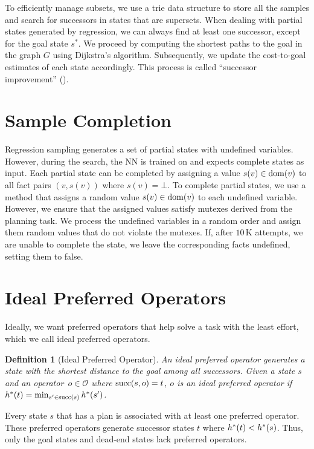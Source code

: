 \documentclass[ppgc,diss,english]{iiufrgs}
\newtheorem{definition}{Definition}
\newtheorem{property}{Property}
\newcommand{\ppi}[2][inline]{\todo[color=purple!50,linecolor={purple!100},#1,fancyline,author=Pedro]{#2}}
\begin{document}
To efficiently manage subsets, we use a trie data structure to store all the samples and search for successors in states that are supersets. When dealing with partial states generated by regression, we can always find at least one successor, except for the goal state $s^{*}$. We proceed by computing the shortest paths to the goal in the graph $G$ using Dijkstra's algorithm. Subsequently, we update the cost-to-goal estimates of each state accordingly. This process is called ``successor improvement'' (\sui).


\section{Sample Completion}
\label{sec:sample-completion}

Regression sampling generates a set of partial states with undefined variables. However, during the search, the NN is trained on and expects complete states as input.
Each partial state can be completed by assigning a value $s(v)\in\operatorname{dom}(v)$ to all fact pairs $(v,s(v))$ where $s(v)=\bot$.
To complete partial states, we use a method that assigns a random value $s(v) \in \operatorname{dom}(v)$ to each undefined variable. However, we ensure that the assigned values satisfy mutexes derived from the planning task. We process the undefined variables in a random order and assign them random values that do not violate the mutexes. If, after $10$\,K attempts, we are unable to complete the state, we leave the corresponding facts undefined, setting them to false.%


\section{Ideal Preferred Operators}
\label{sec:sample-ideal-po}
Ideally, we want preferred operators that help solve a task with the least effort, which we call ideal preferred operators.

\begin{definition}[Ideal Preferred Operator]\label{def:ideal_preferred_operator}
  An ideal preferred operator generates a state with the shortest distance to the goal among all successors. Given a state $s$ and an operator~$o \in \mathcal{O}$ where $\operatorname{succ}(s,o) = t$, $o$ is an ideal preferred operator if $h^*({t}) = \min_{s' \in \operatorname{succ}(s)} h^*({s'})$.
\end{definition}

Every state $s$ that has a plan is associated with at least one preferred operator. These preferred operators generate successor states $t$ where $h^*({t}) < h^*({s})$. Thus, only the goal states and dead-end states lack preferred operators.
\ppi{Removed the property and the proof for now.}
\end{document}
